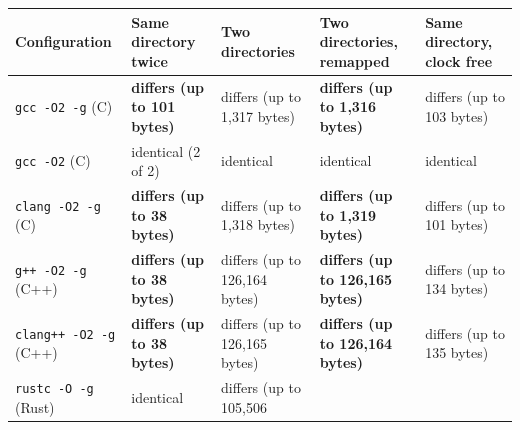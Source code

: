 \documentclass[10pt,letterpaper]{article}
\begin{document}
{\footnotesize\setlength{\tabcolsep}{3.8pt}\renewcommand{\arraystretch}{1.15}
\begin{longtable}[]{@{}
  >{\raggedright\arraybackslash}p{}
  >{\raggedright\arraybackslash}p{}
  >{\raggedright\arraybackslash}p{}
  >{\raggedright\arraybackslash}p{}
  >{\raggedright\arraybackslash}p{}@{}}
\toprule\noalign{}
\begin{minipage}[b]{\linewidth}\raggedright
\textbf{Configuration}
\end{minipage} & \begin{minipage}[b]{\linewidth}\raggedright
\textbf{Same directory twice}
\end{minipage} & \begin{minipage}[b]{\linewidth}\raggedright
\textbf{Two directories}
\end{minipage} & \begin{minipage}[b]{\linewidth}\raggedright
\textbf{Two directories, remapped}
\end{minipage} & \begin{minipage}[b]{\linewidth}\raggedright
\textbf{Same directory, clock free}
\end{minipage} \\
\midrule\noalign{}
\endhead
\bottomrule\noalign{}
\endlastfoot
\texttt{gcc\ -\allowbreak{}O2\ -\allowbreak{}g} (C) & \textbf{differs (up to 101 bytes)} & differs
(up to 1,317 bytes) & \textbf{differs (up to 1,316 bytes)} & differs (up
to 103 bytes) \\
\texttt{gcc\ -O2} (C) & identical (2 of 2) & identical & identical &
identical \\
\texttt{clang\ -\allowbreak{}O2\ -\allowbreak{}g} (C) & \textbf{differs (up to 38 bytes)} &
differs (up to 1,318 bytes) & \textbf{differs (up to 1,319 bytes)} &
differs (up to 101 bytes) \\
\texttt{g++\ -\allowbreak{}O2\ -\allowbreak{}g} (C++) & \textbf{differs (up to 38 bytes)} &
differs (up to 126,164 bytes) & \textbf{differs (up to 126,165 bytes)} &
differs (up to 134 bytes) \\
\texttt{clang++\ -\allowbreak{}O2\ -\allowbreak{}g} (C++) & \textbf{differs (up to 38 bytes)} &
differs (up to 126,165 bytes) & \textbf{differs (up to 126,164 bytes)} &
differs (up to 135 bytes) \\
\texttt{rustc\ -\allowbreak{}O\ -\allowbreak{}g} (Rust) & identical & differs (up to 105,506

\end{longtable}}
\end{document}
